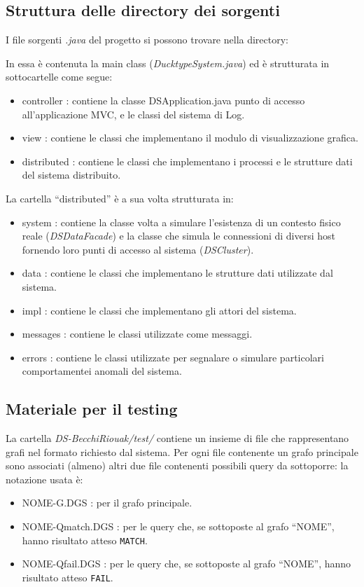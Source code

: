 \subsection{Struttura delle directory dei sorgenti}
I file sorgenti \emph{.java} del progetto si possono trovare nella directory:


In essa è contenuta la main class (\emph{DucktypeSystem.java})
ed è strutturata in sottocartelle come segue:
\begin{itemize}
\item controller : contiene la classe DSApplication.java punto di accesso
  all'applicazione MVC, e le classi del sistema di Log.
\item view : contiene le classi che implementano il modulo di visualizzazione grafica.
\item distributed : contiene le classi che implementano i processi e le strutture
  dati del sistema distribuito.
\end{itemize}

La cartella ``distributed'' è a sua volta strutturata in:
\begin{itemize}
\item system : contiene la classe volta a simulare l'esistenza di un
  contesto fisico reale (\emph{DSDataFacade})
  e la classe che simula le connessioni di diversi host
  fornendo loro punti di accesso al sistema (\emph{DSCluster}).
\item data : contiene le classi che implementano le strutture dati
  utilizzate dal sistema.
\item impl : contiene le classi che implementano gli attori del sistema.
\item messages : contiene le classi utilizzate come messaggi.
\item errors : contiene le classi utilizzate per segnalare o simulare
  particolari comportamentei anomali del sistema.
\end{itemize}

\subsection{Materiale per il testing}
La cartella \emph{DS-BecchiRiouak/test/} contiene un insieme di file che
rappresentano grafi nel formato richiesto dal sistema.
Per ogni file contenente un grafo principale sono associati (almeno)
altri due file contenenti possibili query da sottoporre: la notazione
usata è:
\begin{itemize}
\item NOME-G.DGS : per il grafo principale.
\item NOME-Qmatch.DGS : per le query che, se sottoposte al grafo ``NOME'',
  hanno risultato atteso \texttt{MATCH}.
\item NOME-Qfail.DGS : per le query che, se sottoposte al grafo ``NOME'',
  hanno risultato atteso \texttt{FAIL}.
\end{itemize}

